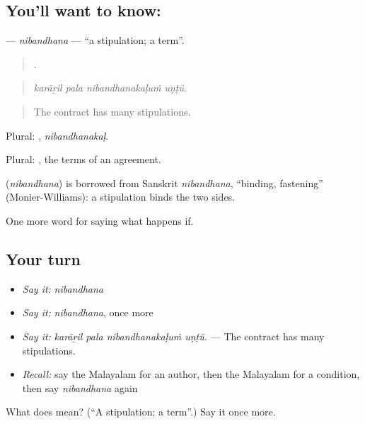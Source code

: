\subsection*{You'll want to know: }
\textbf{} — \emph{nibandhana} — \textquotedblleft{}a stipulation; a term\textquotedblright{}.

\begin{quote}
   .
\end{quote}

\begin{quote}
\emph{karāṟil pala nibandhanakaḷuṁ uṇṭŭ.}
\end{quote}

\begin{quote}
The contract has many stipulations.
\end{quote}

Plural: , \emph{nibandhanakaḷ}.

Plural: , the terms of an agreement.

\begin{cousinweb}
\textbf{} (\emph{nibandhana}) is borrowed from Sanskrit \emph{nibandhana}, \textquotedblleft{}binding, fastening\textquotedblright{} (Monier-Williams): a stipulation binds the two sides.
\end{cousinweb}

\begin{grammarlens}[title={What you've built}]
One more word for saying what happens if.
\end{grammarlens}

\subsection*{Your turn}
\begin{itemize}
\raggedright
  \item \emph{Say it:} \emph{nibandhana}
  \item \emph{Say it:} \emph{nibandhana}, once more
  \item \emph{Say it:} \emph{karāṟil pala nibandhanakaḷuṁ uṇṭŭ.} — The contract has many stipulations.
  \item \emph{Recall:} say the Malayalam for an author, then the Malayalam for a condition, then say \emph{nibandhana} again
\end{itemize}

\begin{tcolorbox}[breakable,colback=teal!4,colframe=teal!35!black,title={Before you move on}]
What does  mean? (\textquotedblleft{}A stipulation; a term\textquotedblright{}.) Say it once more.
\end{tcolorbox}
